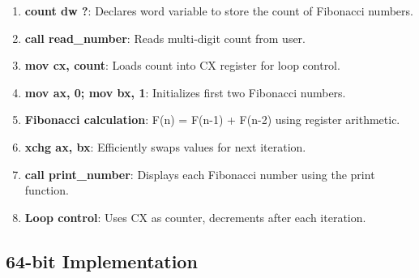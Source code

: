 \documentclass[12pt,a4paper]{article}
\begin{document}
\begin{enumerate}
\item \textbf{count dw ?}: Declares word variable to store the count of Fibonacci numbers.
\item \textbf{call read\_number}: Reads multi-digit count from user.
\item \textbf{mov cx, count}: Loads count into CX register for loop control.
\item \textbf{mov ax, 0; mov bx, 1}: Initializes first two Fibonacci numbers.
\item \textbf{Fibonacci calculation}: F(n) = F(n-1) + F(n-2) using register arithmetic.
\item \textbf{xchg ax, bx}: Efficiently swaps values for next iteration.
\item \textbf{call print\_number}: Displays each Fibonacci number using the print function.
\item \textbf{Loop control}: Uses CX as counter, decrements after each iteration.
\end{enumerate}

\subsection{64-bit Implementation}
\end{document}
